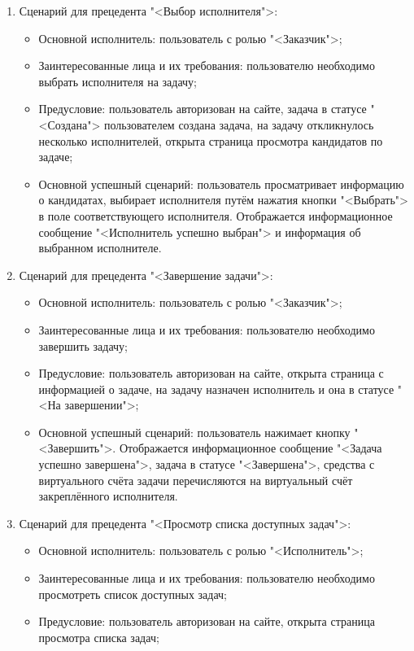 \begin{enumerate}
\begin{itemize}
	\end{itemize}
\item Сценарий для прецедента "<Выбор исполнителя">:
	\begin{itemize}
		\item Основной исполнитель: пользователь с ролью "<Заказчик">;
		\item Заинтересованные лица и их требования: пользователю необходимо выбрать исполнителя на задачу;
		\item Предусловие: пользователь авторизован на сайте, задача в статусе "<Создана"> пользователем создана задача, на задачу откликнулось несколько исполнителей, открыта страница просмотра кандидатов по задаче;
		\item Основной успешный сценарий: пользователь просматривает информацию о кандидатах, выбирает исполнителя путём нажатия кнопки "<Выбрать"> в поле соответствующего исполнителя. Отображается информационное сообщение "<Исполнитель успешно выбран"> и информация об выбранном исполнителе.
	\end{itemize}
\item Сценарий для прецедента "<Завершение задачи">:
	\begin{itemize}
		\item Основной исполнитель: пользователь с ролью "<Заказчик">;
		\item Заинтересованные лица и их требования: пользователю необходимо завершить задачу;
		\item Предусловие: пользователь авторизован на сайте, открыта страница с информацией о задаче, на задачу назначен исполнитель и она в статусе "<На завершении">;
		\item Основной успешный сценарий: пользователь нажимает кнопку "<Завершить">. Отображается информационное сообщение "<Задача успешно завершена">, задача в статусе "<Завершена">, средства с виртуального счёта задачи перечисляются на виртуальный счёт закреплённого исполнителя.
	\end{itemize}
\item Сценарий для прецедента "<Просмотр списка доступных задач">:
	\begin{itemize}
		\item Основной исполнитель: пользователь с ролью "<Исполнитель">;
		\item Заинтересованные лица и их требования: пользователю необходимо просмотреть список доступных задач;
		\item Предусловие: пользователь авторизован на сайте, открыта страница просмотра списка задач;

\end{itemize}
\end{enumerate}
